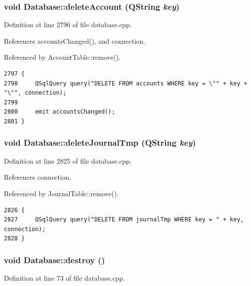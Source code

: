\hypertarget{classDatabase_a40}{
\subsubsection[deleteAccount]{\setlength{\rightskip}{0pt plus 5cm}void Database::delete\-Account (QString {\em key})}}
\label{classDatabase_a40}


Definition at line 2796 of file database.cpp.

References accounts\-Changed(), and connection.

Referenced by Account\-Table::remove().

\footnotesize\begin{verbatim}2797 {
2798     QSqlQuery query("DELETE FROM accounts WHERE key = \"" + key + "\"", connection);
2799     
2800     emit accountsChanged();
2801 }
\end{verbatim}\normalsize 


\hypertarget{classDatabase_a42}{
\subsubsection[deleteJournalTmp]{\setlength{\rightskip}{0pt plus 5cm}void Database::delete\-Journal\-Tmp (QString {\em key})}}
\label{classDatabase_a42}


Definition at line 2825 of file database.cpp.

References connection.

Referenced by Journal\-Table::remove().

\footnotesize\begin{verbatim}2826 {
2827     QSqlQuery query("DELETE FROM journalTmp WHERE key = " + key, connection);
2828 }
\end{verbatim}\normalsize 


\hypertarget{classDatabase_a0}{
\subsubsection[destroy]{\setlength{\rightskip}{0pt plus 5cm}void Database::destroy ()}}
\label{classDatabase_a0}


Definition at line 73 of file database.cpp.


